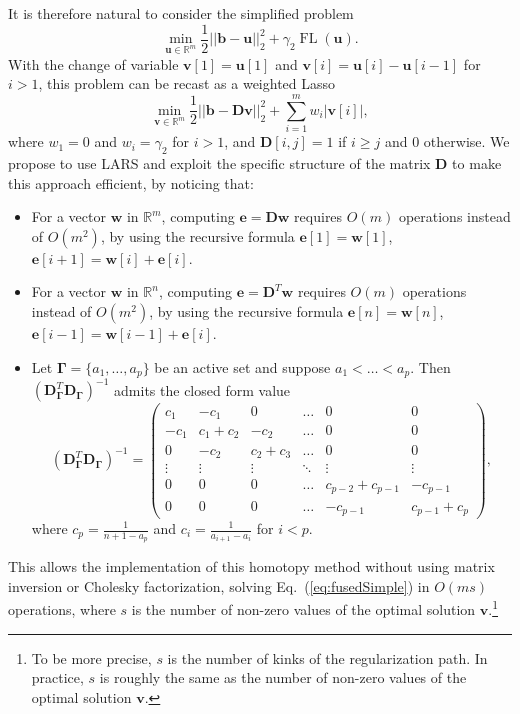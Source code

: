 \documentclass[twoside,11pt]{article}
\def\v{{\mathbf v}}
\def\Gammab{{\boldsymbol\Gamma}}
\def\Gammab{{\boldsymbol\Gamma}}
\def\w{{\mathbf w}}
\def\D{{\mathbf D}}
\def\e{{\mathbf e}}
\def\b{{\mathbf b}}
\def\u{{\mathbf u}}
\def\Real{{\mathbb R}}
\def\u{{\mathbf u}}
\def\FL{\operatorname{FL}}
\begin{document}
It is therefore natural to consider the simplified problem
\begin{equation}
   \min_{\u \in \Real^m} \frac{1}{2}||\b-\u||_2^2  +
   \gamma_2 \FL(\u).  \label{eq:fusedSimple2}
\end{equation}
With the change of variable $\v[1]=\u[1]$ and $\v[i]=\u[i]-\u[i-1]$ for $i > 1$,
this problem can be recast as a weighted Lasso
\begin{equation}
   \min_{\v \in \Real^m} \frac{1}{2}||\b-\D\v||_2^2  +
   \sum_{i=1}^m w_i |\v[i]|, \label{eq:fusedSimple}
\end{equation}
where $w_1=0$ and $w_i=\gamma_2$ for $i > 1$, and $\D[i,j] = 1$ if $i \geq j$
and $0$ otherwise. We propose to use LARS
\citep{efron} and exploit the specific structure of the matrix $\D$ to make this
approach efficient, by noticing that:
\begin{itemize}
   \item For a vector $\w$ in $\Real^m$, computing $\e=\D\w$ requires $O(m)$
      operations instead of $O(m^2)$, by using the recursive formula
      $\e[1]=\w[1]$, $\e[i+1]=\w[i]+\e[i]$.
   \item For a vector $\w$ in $\Real^n$, computing $\e=\D^T\w$ requires $O(m)$
      operations instead of $O(m^2)$, by using the recursive formula
      $\e[n]=\w[n]$, $\e[i-1]=\w[i-1]+\e[i]$.
   \item Let $\Gammab = \{a_1,\ldots,a_p\}$ be an active set and suppose $a_1 < \ldots < a_p$. 
      Then $(\D_\Gammab^T\D_\Gammab)^{-1}$ admits the closed form value
      \begin{displaymath}
         (\D_\Gammab^T\D_\Gammab)^{-1} = \left(
         \begin{array}{cccccc}
            c_1 & -c_1 & 0 & \ldots & 0 & 0\\
            -c_1 & c_1+c_2 & -c_2 & \ldots & 0 & 0 \\
            0 & -c_2 & c_2+c_3 & \ldots & 0 & 0\\
            \vdots & \vdots & \vdots & \ddots & \vdots & \vdots \\
            0 & 0 & 0 & \ldots & c_{p-2}+c_{p-1} & -c_{p-1} \\
            0 & 0 & 0 & \ldots & -c_{p-1} & c_{p-1}+c_{p}
         \end{array}
         \right),
      \end{displaymath}
      where $c_p = \frac{1}{n+1-a_p}$ and $c_i = \frac{1}{a_{i+1}-a_{i}}$ for $i < p$.
\end{itemize}
This allows the implementation of this homotopy method without using matrix inversion 
or Cholesky factorization, solving Eq.~(\ref{eq:fusedSimple}) in $O(m s)$ operations,
where $s$ is the number of non-zero values of the optimal solution
$\v$.\footnote{To be more precise, $s$ is the number of kinks of the
regularization path. In practice, $s$ is roughly the same as the number of
non-zero values of the optimal solution $\v$.}
\end{document}
